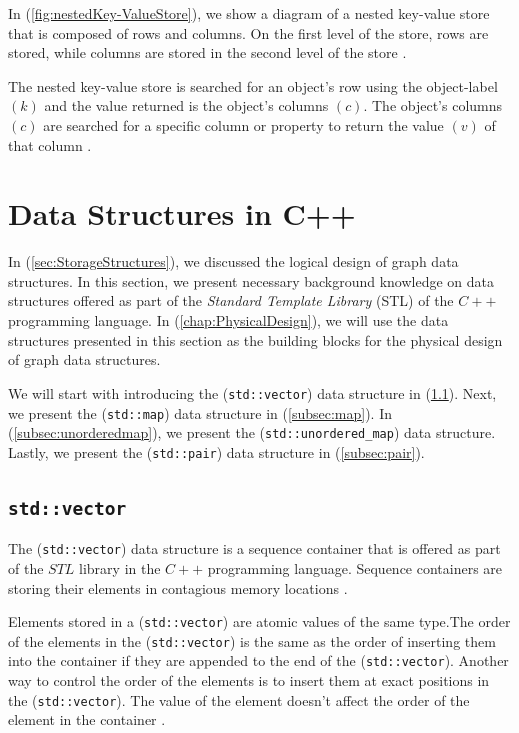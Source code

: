 {In (\ref{fig:nestedKey-ValueStore}), we show a diagram of a nested key-value store that is composed of rows and columns. On the first level of the store, rows are stored, while columns are stored in the second level of the store \cite{ladwig2011cumulusrdf}.

The nested key-value store is searched for an object's row using the object-label $(k)$ and the value returned is the object's columns $(c)$. The object's columns $(c)$ are searched for a specific column or property to return the value $(v)$ of that column \cite{ladwig2011cumulusrdf}.




\section{Data Structures in C++}
\label{sec:DataStructuresInC++}

In (\ref{sec:StorageStructures}), we discussed the logical design of graph data structures. In this section, we present necessary background knowledge on data structures offered as part of the \textit{Standard Template Library} (STL) of the $C++$ programming language. In (\ref{chap:PhysicalDesign}), we will use the data structures presented in this section as the building blocks for the physical design of graph data structures.

We will start with introducing the (\texttt{std::vector}) data structure in (\ref{subsec:vector}). Next, we present the (\texttt{std::map}) data structure in (\ref{subsec:map}). In (\ref{subsec:unorderedmap}), we present the (\texttt{std::unordered\_map}) data structure. Lastly, we present the (\texttt{std::pair}) data structure in (\ref{subsec:pair}).

\subsection{\texttt{std::vector}}
\label{subsec:vector}

The (\texttt{std::vector}) data structure is a sequence container that is offered as part of the $STL$ library in the $C++$ programming language. Sequence containers are storing their elements in contagious memory locations \cite{josuttis2012c++}.

Elements stored in a (\texttt{std::vector}) are atomic values of the same type.The order of the elements in the (\texttt{std::vector}) is the same as the order of inserting them into the container if they are appended to the end of the (\texttt{std::vector}). Another way to control the order of the elements is to insert them at exact positions in the (\texttt{std::vector}). The value of the element doesn't affect the order of the element in the container \cite{josuttis2012c++}. 

}

